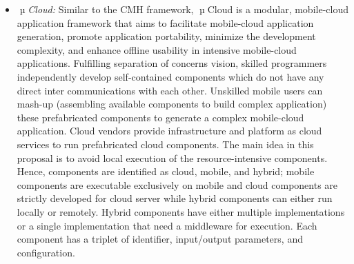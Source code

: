 \documentclass[publish]{IEEEtran}
\begin{document}
\begin{itemize}
However, developing CMH applications is significantly complex due to the interoperability and vendor lock-in problems in clouds and fragmentation issue in mobiles \cite{Z2012}. Cloud components designed for a specific cloud are not able to move to another cloud due to underlying heterogeneity among clouds. Similarly, mobile components developed for a particular platform cannot be ported to different platforms because of heterogeneity. Yet isolating development of mobile and cloud components creates further versioning and integration challenges.

To mitigate the complexity of CMH application developments and facilitate portability, the authors leverage Domain Specific Language (DSL) \cite{Ranabahu2011,Deursen2000}. A DSL is a programming language with major focus on solving problem in specific domains. MATLAB\footnote{http://www.mathworks.com/products/matlab/} is a well-known DSL-based tool for mathematicians. A parser takes a DSL script and converts codes into an in-memory object to be forwarded to various automatic component generators. The system needs different code generators for various mobile and cloud platforms. Once the mobile and cloud components are generated, the CMH application can be assembled for various mobile-cloud platforms. However, utilizing DSL-based techniques requires more generalization efforts to be beneficial in developing  all types of CMH applications.

\item \textit{$\tcmu$Cloud:}
Similar to the CMH framework, $\tcmu$Cloud \cite{March2011} is a modular, mobile-cloud application framework that aims to facilitate mobile-cloud application generation, promote application portability, minimize the development complexity, and enhance offline usability in intensive mobile-cloud applications. Fulfilling separation of concerns vision, skilled programmers independently develop self-contained components which do not have any direct inter communications with each other. Unskilled mobile users can mash-up (assembling available components to build complex application) these prefabricated components to generate a complex mobile-cloud application. Cloud vendors provide infrastructure and platform as cloud services to run prefabricated cloud components. The main idea in this proposal is to avoid local execution of the resource-intensive components. Hence, components are identified as cloud, mobile, and hybrid; mobile components are executable exclusively on mobile and cloud components are strictly developed for cloud server while hybrid components can either run locally or remotely. Hybrid components have either multiple implementations or a single implementation that need a middleware for execution. Each component has a triplet of identifier, input/output parameters, and configuration.


\end{itemize}
\end{document}
